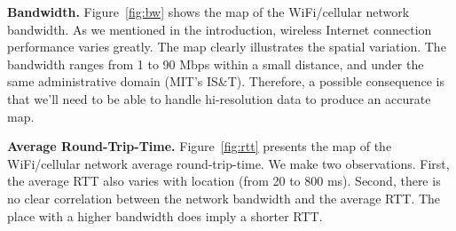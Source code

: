 {\bfseries Bandwidth.}
Figure~\ref{fig:bw} shows the map of the WiFi/cellular network bandwidth.
As we mentioned in the introduction, wireless Internet connection performance
varies greatly. The map clearly illustrates the spatial variation. The bandwidth
ranges from 1 to 90 Mbps within a small distance, and under the same administrative
domain (MIT's IS\&T). Therefore, a possible consequence is that we'll need to
be able to handle hi-resolution data to produce an accurate map.

{\bfseries Average Round-Trip-Time.}
Figure~\ref{fig:rtt} presents the map of the WiFi/cellular network average
round-trip-time. We make two observations. First, the average RTT also
varies with location (from 20 to 800 ms). Second, there is no clear
correlation between the network bandwidth and the average RTT. The place with a
higher bandwidth does imply a shorter RTT.
